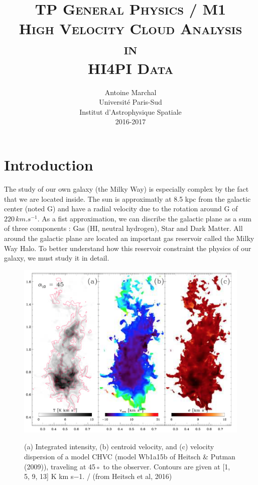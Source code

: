 \documentclass[a4paper,10.5pt]{report}
\title{{\textsc{\Large{TP General Physics / M1}\\ [3cm]
      \textbf{\LARGE{High Velocity Cloud Analysis \\ in \\ HI4PI Data}}}} \\[2cm]}
\author{Antoine Marchal \\ [1cm]
Université Paris-Sud \\ 
Institut d’Astrophysique Spatiale \\
2016-2017}
\date{}
\begin{document}
\begin{titlingpage}
\maketitle
\end{titlingpage}
\newpage

\newpage
\chapter{Introduction}
The study of our own galaxy (the Milky Way) is especially complex by the fact that we are located inside. The sun is approximatly
at 8.5 kpc from the galactic center (noted G) and have a radial velocity due to the rotation around G of $ 220 \, km.s^{-1}$. 
As a fist approximation, we can discribe the galactic plane as a sum of three components : Gas (HI, neutral hydrogen), Star 
and Dark Matter. All around the galactic plane are located an important gas reservoir called the Milky Way Halo. To better 
understand how this reservoir constraint the physics of our galaxy, we must study it in detail. \\

\begin{figure}[h!]
  \centering
  \includegraphics[width=4.in]{simulation}
  \label{fig::simulation}
  \caption{(a) Integrated intensity, (b) centroid velocity, and (c) velocity dispersion of a model CHVC (model Wb1a15b of 
    Heitsch & Putman (2009)), traveling at 45◦ to the observer. Contours are given at [1, 5, 9, 13] K km s−1.  / 
    (from Heitsch et al, 2016)}
\end{figure} \\
 
\end{document}
